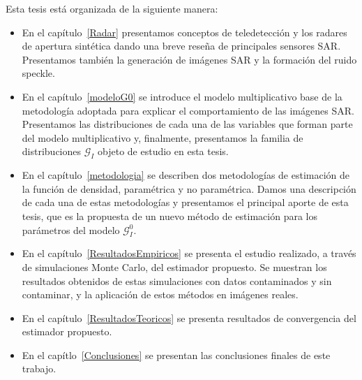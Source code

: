 Esta tesis está organizada de la siguiente manera:
\begin{itemize}
	\item En el capítulo~\ref{Radar} presentamos conceptos de teledetección y los radares de apertura sintética dando una breve reseña de principales sensores SAR. Presentamos también la generación de imágenes SAR y  la formación del ruido speckle.
	\item En el capítulo~\ref{modeloG0} se introduce el modelo multiplicativo base de la metodología adoptada para explicar el comportamiento de las imágenes SAR. Presentamos las distribuciones de cada una de las variables que forman parte del modelo multiplicativo y, finalmente, presentamos la familia de distribuciones $\mathcal{G}_I$ objeto de estudio en esta tesis.
	\item En el capítulo~\ref{metodologia}  se describen dos metodologías de estimación de la función de densidad, paramétrica y no paramétrica. Damos una descripción de cada una de estas metodologías y presentamos el principal aporte de esta tesis, que es la propuesta de un nuevo método de estimación para los parámetros del modelo $\mathcal G_I^0$.
	\item En el capítulo~\ref{ResultadosEmpiricos} se presenta el estudio realizado, a través de simulaciones Monte Carlo, del estimador propuesto. Se muestran los resultados obtenidos de estas simulaciones  con datos contaminados y sin contaminar, y la aplicación de estos métodos en imágenes reales.
	\item En el capítulo~\ref{ResultadosTeoricos} se presenta resultados de convergencia del estimador propuesto.
	\item En el capítlo~\ref{Conclusiones} se presentan las conclusiones finales de este trabajo.
	
\end{itemize}
